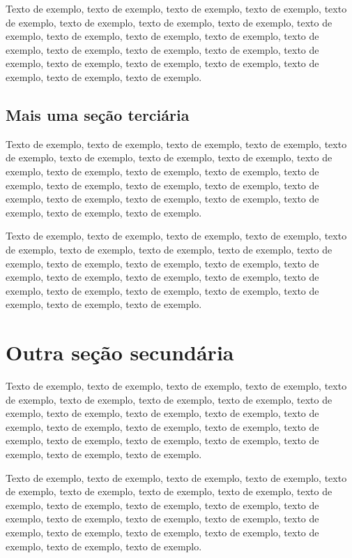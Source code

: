 \documentclass[
	12pt,				%
	oneside,			%
	a4paper,			%
	english,			%
	brazil				%
	]{abntex2ppgsi}
\begin{document}
Texto de exemplo, texto de exemplo, texto de exemplo, texto de exemplo, texto de exemplo, texto de exemplo, texto de exemplo, texto de exemplo, texto de exemplo, texto de exemplo, texto de exemplo, texto de exemplo, texto de exemplo, texto de exemplo, texto de exemplo, texto de exemplo, texto de exemplo, texto de exemplo, texto de exemplo, texto de exemplo, texto de exemplo, texto de exemplo, texto de exemplo.

\subsection{Mais uma seção terciária}

Texto de exemplo, texto de exemplo, texto de exemplo, texto de exemplo, texto de exemplo, texto de exemplo, texto de exemplo, texto de exemplo, texto de exemplo, texto de exemplo, texto de exemplo, texto de exemplo, texto de exemplo, texto de exemplo, texto de exemplo, texto de exemplo, texto de exemplo, texto de exemplo, texto de exemplo, texto de exemplo, texto de exemplo, texto de exemplo, texto de exemplo.

Texto de exemplo, texto de exemplo, texto de exemplo, texto de exemplo, texto de exemplo, texto de exemplo, texto de exemplo, texto de exemplo, texto de exemplo, texto de exemplo, texto de exemplo, texto de exemplo, texto de exemplo, texto de exemplo, texto de exemplo, texto de exemplo, texto de exemplo, texto de exemplo, texto de exemplo, texto de exemplo, texto de exemplo, texto de exemplo, texto de exemplo.

\section{Outra seção secundária}

Texto de exemplo, texto de exemplo, texto de exemplo, texto de exemplo, texto de exemplo, texto de exemplo, texto de exemplo, texto de exemplo, texto de exemplo, texto de exemplo, texto de exemplo, texto de exemplo, texto de exemplo, texto de exemplo, texto de exemplo, texto de exemplo, texto de exemplo, texto de exemplo, texto de exemplo, texto de exemplo, texto de exemplo, texto de exemplo, texto de exemplo.

Texto de exemplo, texto de exemplo, texto de exemplo, texto de exemplo, texto de exemplo, texto de exemplo, texto de exemplo, texto de exemplo, texto de exemplo, texto de exemplo, texto de exemplo, texto de exemplo, texto de exemplo, texto de exemplo, texto de exemplo, texto de exemplo, texto de exemplo, texto de exemplo, texto de exemplo, texto de exemplo, texto de exemplo, texto de exemplo, texto de exemplo.
\end{document}

